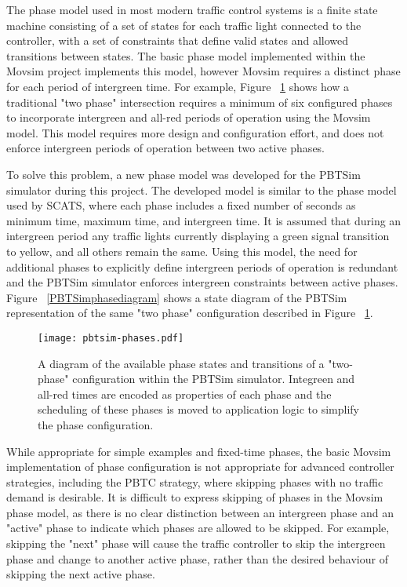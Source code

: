 The phase model used in most modern traffic control systems is a finite state machine consisting of a set of states for each traffic light connected to the controller, with a set of constraints that define valid states and allowed transitions between states. The basic phase model implemented within the Movsim project implements this model, however Movsim requires a distinct phase for each period of intergreen time. For example, Figure ~\ref{movsimphasediagram} shows how a traditional "two phase" intersection requires a minimum of six configured phases to incorporate intergreen and all-red periods of operation using the Movsim model. This model requires more design and configuration effort, and does not enforce intergreen periods of operation between two active phases.

To solve this problem, a new phase model was developed for the PBTSim simulator during this project. The developed model is similar to the phase model used by SCATS, where each phase includes a fixed number of seconds as minimum time, maximum time, and intergreen time. It is assumed that during an intergreen period any traffic lights currently displaying a green signal transition to yellow, and all others remain the same. Using this model, the need for additional phases to explicitly define intergreen periods of operation is redundant and the PBTSim simulator enforces intergreen constraints between active phases. Figure ~\ref{PBTSimphasediagram} shows a state diagram of the PBTSim representation of the same "two phase" configuration described in Figure ~\ref{movsimphasediagram}.

\begin{figure}[]
\centering
	\texttt{[image: pbtsim-phases.pdf]}
	\caption{ A diagram of the available phase states and transitions of a "two-phase" configuration within the PBTSim simulator. Integreen and all-red times are encoded as properties of each phase and the scheduling of these phases is moved to application logic to simplify the phase configuration. }
\label{movsimphasediagram}
\end{figure}

While appropriate for simple examples and fixed-time phases, the basic Movsim implementation of phase configuration is not appropriate for advanced controller strategies, including the PBTC strategy, where skipping phases with no traffic demand is desirable. It is difficult to express skipping of phases in the Movsim phase model, as there is no clear distinction between an intergreen phase and an "active" phase to indicate which phases are allowed to be skipped. For example, skipping the "next" phase will cause the traffic controller to skip the intergreen phase and change to another active phase, rather than the desired behaviour of skipping the next active phase.

